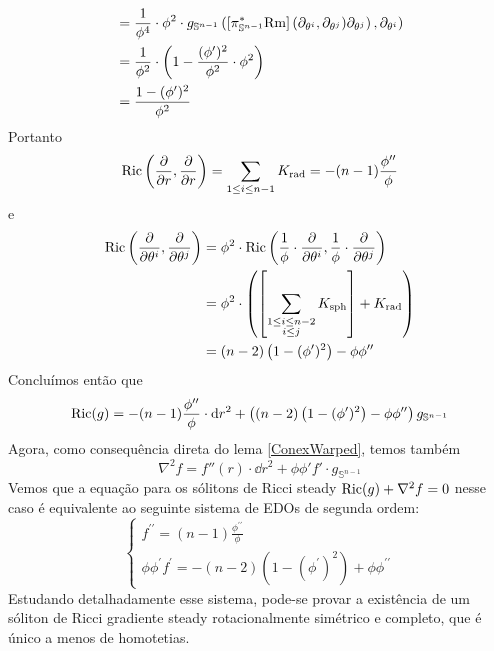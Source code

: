 \begin{exem}
\[\begin{aligned}
&= \frac{1}{\phi^4} \cdot \phi^2 \cdot g_{\mathbb{S}^{n-1}} \left( [\pi_{\mathbb{S}^{n-1}}^{*} \mathrm{Rm}]\left(\partial_{\theta^i}, \partial_{\theta^j}) \partial_{\theta^j} \right) , \partial_{\theta^i}\right) \\
&= \frac{1}{\phi^2} \cdot \left(1 - \frac{(\phi')^2}{\phi^2} \cdot \phi^2 \right) \\
&= \frac{1-(\phi')^2}{\phi^2}
\end{aligned}
\]
Portanto
\[
\mathrm{Ric}\left(\frac{\partial}{\partial r}, \frac{\partial}{\partial r} \right) = \sum_{1 \leq i \leq n -1} K_{{\rm rad}} = -(n-1) \frac{\phi''}{\phi}
\]
e 
\[ \begin{aligned}
\mathrm{Ric}\left(\frac{\partial}{\partial \theta^i}, \frac{\partial}{\partial \theta^j} \right) &= \phi^2 \cdot \mathrm{Ric}\left(\frac{1}{\phi} \cdot \frac{\partial}{\partial \theta^i}, \frac{1}{\phi} \cdot \frac{\partial}{\partial \theta^j} \right) \\
&= \phi^2 \cdot \left(\left[\sum_{\substack{1 \leq i \leq n-2 \\
i \leq j}} K_{{\rm sph}} \right] + K_{{\rm rad}}\right) \\
&= (n-2) \left( 1 - (\phi')^2 \right) - \phi \phi''
\end{aligned}
\]
Concluímos então que
\[
\mathrm{Ric}(g) = -(n-1) \frac{\phi''}{\phi} \cdot \mathrm{d} r^2 + \left(  (n-2) \left( 1 - (\phi')^2 \right) - \phi \phi'' \right) g_{\mathbb{S}^{n-1}}
\]
Agora, como consequência direta do lema \cref{ConexWarped}, temos também
\[
\nabla^2 f = f''(r) \cdot \dd r^2 + \phi \phi' f' \cdot  g_{\mathbb{S}^{n-1}}
\]
Vemos que a equação para os sólitons de Ricci steady $\mathrm{Ric}(g) + \nabla^2 f = 0$ nesse caso é equivalente ao seguinte sistema de EDOs de segunda ordem:
\[
\begin{cases}
f^{\prime \prime}=(n-1) \frac{\phi^{\prime \prime}}{\phi} \\
\phi \phi^{\prime} f^{\prime}=-(n-2)\left(1-\left(\phi^{\prime}\right)^{2}\right)+\phi \phi^{\prime \prime}
\end{cases}
\]
Estudando detalhadamente esse sistema, pode-se provar a existência de um sóliton de Ricci gradiente steady rotacionalmente simétrico e completo, que é único a menos de homotetias. 

\end{exem}



